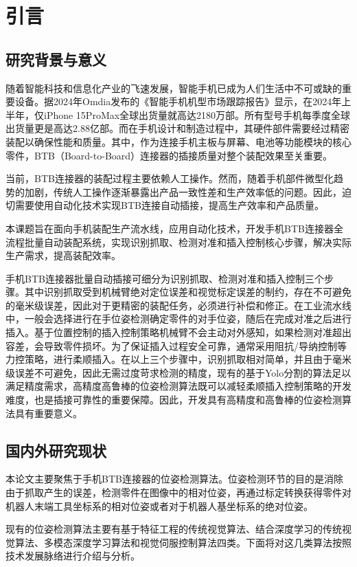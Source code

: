\documentclass{Diploma}
\begin{document}
\chapter[preface]{引言}
\section{研究背景与意义}
随着智能科技和信息化产业的飞速发展，智能手机已成为人们生活中不可或缺的重要设备。据2024年Omdia发布的《智能手机机型市场跟踪报告》显示，在2024年上半年，仅iPhone 15ProMax全球出货量就高达2180万部。所有型号手机每季度全球出货量更是高达2.88亿部。而在手机设计和制造过程中，其硬件部件需要经过精密装配以确保性能和质量。其中，作为连接手机主板与屏幕、电池等功能模块的核心零件，BTB（Board-to-Board）连接器的插接质量对整个装配效果至关重要。

当前，BTB连接器的装配过程主要依赖人工操作。然而，随着手机部件微型化趋势的加剧，传统人工操作逐渐暴露出产品一致性差和生产效率低的问题。因此，迫切需要使用自动化技术实现BTB连接自动插接，提高生产效率和产品质量。
%

本课题旨在面向手机装配生产流水线，应用自动化技术，开发手机BTB连接器全流程批量自动装配系统，实现识别抓取、检测对准和插入控制核心步骤，解决实际生产需求，提高装配效率。

手机BTB连接器批量自动插接可细分为识别抓取、检测对准和插入控制三个步骤。其中识别抓取受到机械臂绝对定位误差和视觉标定误差的制约，存在不可避免的毫米级误差，因此对于更精密的装配任务，必须进行补偿和修正。在工业流水线中，一般会选择进行在手位姿检测确定零件的对手位姿，随后在完成对准之后进行插入。基于位置控制的插入控制策略机械臂不会主动对外感知，如果检测对准超出容差，会导致零件损坏。为了保证插入过程安全可靠，通常采用阻抗/导纳控制等力控策略，进行柔顺插入。在以上三个步骤中，识别抓取相对简单，并且由于毫米级误差不可避免，因此无需过度苛求检测的精度，现有的基于Yolo分割的算法足以满足精度需求，高精度高鲁棒的位姿检测算法既可以减轻柔顺插入控制策略的开发难度，也是插接可靠性的重要保障。因此，开发具有高精度和高鲁棒的位姿检测算法具有重要意义。
\section{国内外研究现状}
本论文主要聚焦于手机BTB连接器的位姿检测算法。位姿检测环节的目的是消除由于抓取产生的误差，检测零件在图像中的相对位姿，再通过标定转换获得零件对机器人末端工具坐标系的相对位姿或者对于机器人基坐标系的绝对位姿。

现有的位姿检测算法主要有基于特征工程的传统视觉算法、结合深度学习的传统视觉算法、多模态深度学习算法和视觉伺服控制算法四类。下面将对这几类算法按照技术发展脉络进行介绍与分析。
\end{document}

